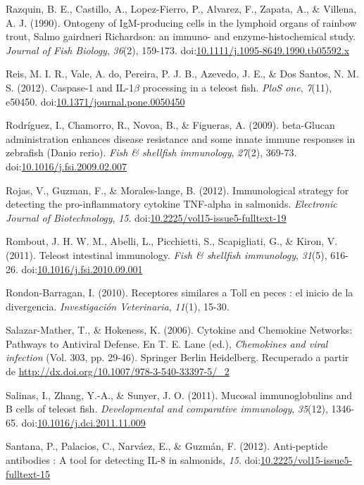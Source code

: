 \documentclass[12pt,letterpaper,oneside]{scrbook}
\begin{document}
Razquin, B. E., Castillo, A., Lopez-Fierro, P., Alvarez, F., Zapata, A.,
\& Villena, A. J. (1990). Ontogeny of IgM-producing cells in the
lymphoid organs of rainbow trout, Salmo gairdneri Richardson: an immuno-
and enzyme-histochemical study. \emph{Journal of Fish Biology},
\emph{36}(2), 159-173.
doi:\href{http://dx.doi.org/10.1111/j.1095-8649.1990.tb05592.x}{10.1111/j.1095-8649.1990.tb05592.x}

Reis, M. I. R., Vale, A. do, Pereira, P. J. B., Azevedo, J. E., \& {Dos
Santos}, N. M. S. (2012). Caspase-1 and IL-1\(\beta\) processing in a
teleost fish. \emph{PloS one}, \emph{7}(11), e50450.
doi:\href{http://dx.doi.org/10.1371/journal.pone.0050450}{10.1371/journal.pone.0050450}

Rodríguez, I., Chamorro, R., Novoa, B., \& Figueras, A. (2009).
beta-Glucan administration enhances disease resistance and some innate
immune responses in zebrafish (Danio rerio). \emph{Fish \& shellfish
immunology}, \emph{27}(2), 369-73.
doi:\href{http://dx.doi.org/10.1016/j.fsi.2009.02.007}{10.1016/j.fsi.2009.02.007}

Rojas, V., Guzman, F., \& Morales-lange, B. (2012). Immunological
strategy for detecting the pro-inflammatory cytokine TNF-alpha in
salmonids. \emph{Electronic Journal of Biotechnology}, \emph{15}.
doi:\href{http://dx.doi.org/10.2225/vol15-issue5-fulltext-19}{10.2225/vol15-issue5-fulltext-19}

Rombout, J. H. W. M., Abelli, L., Picchietti, S., Scapigliati, G., \&
Kiron, V. (2011). Teleost intestinal immunology. \emph{Fish \& shellfish
immunology}, \emph{31}(5), 616-26.
doi:\href{http://dx.doi.org/10.1016/j.fsi.2010.09.001}{10.1016/j.fsi.2010.09.001}

Rondon-Barragan, I. (2010). Receptores similares a Toll en peces : el
inicio de la divergencia. \emph{Investigación Veterinaria},
\emph{11}(1), 15-30.

Salazar-Mather, T., \& Hokeness, K. (2006). Cytokine and Chemokine
Networks: Pathways to Antiviral Defense. En T. E. Lane (ed.),
\emph{Chemokines and viral infection} (Vol. 303, pp. 29-46). Springer
Berlin Heidelberg. Recuperado a partir de
\url{http://dx.doi.org/10.1007/978-3-540-33397-5/_2}

Salinas, I., Zhang, Y.-A., \& Sunyer, J. O. (2011). Mucosal
immunoglobulins and B cells of teleost fish. \emph{Developmental and
comparative immunology}, \emph{35}(12), 1346-65.
doi:\href{http://dx.doi.org/10.1016/j.dci.2011.11.009}{10.1016/j.dci.2011.11.009}

Santana, P., Palacios, C., Narváez, E., \& Guzmán, F. (2012).
Anti-peptide antibodies : A tool for detecting IL-8 in salmonids,
\emph{15}.
doi:\href{http://dx.doi.org/10.2225/vol15-issue5-fulltext-15}{10.2225/vol15-issue5-fulltext-15}
\end{document}
